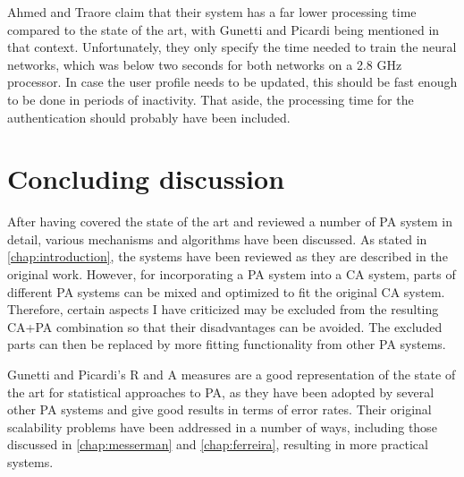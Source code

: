 \documentclass[informationsecurity]{gucmasterproject}
\begin{document}
Ahmed and Traore \cite{Ahmed} claim that their system has a far lower processing time compared to the state of the art, with Gunetti and Picardi \cite{gnp} being mentioned in that context.
Unfortunately, they only specify the time needed to train the neural networks, which was below two seconds for both networks on a 2.8 GHz processor.
In case the user profile needs to be updated, this should be fast enough to be done in periods of inactivity.
That aside, the processing time for the authentication should probably have been included.








\chapter{Concluding discussion}
\label{chap:conclusion}

After having covered the state of the art and reviewed a number of PA system in detail, various mechanisms and algorithms have been discussed.
As stated in \cref{chap:introduction}, the systems have been reviewed as they are described in the original work.
However, for incorporating a PA system into a CA system, parts of different PA systems can be mixed and optimized to fit the original CA system.
Therefore, certain aspects I have criticized may be excluded from the resulting CA+PA combination so that their disadvantages can be avoided.
The excluded parts can then be replaced by more fitting functionality from other PA systems.

Gunetti and Picardi's \cite{gnp} R and A measures are a good representation of the state of the art for statistical approaches to PA, as they have been adopted by several other PA systems and give good results in terms of error rates.
Their original scalability problems have been addressed in a number of ways, including those discussed in \cref{chap:messerman} and \cref{chap:ferreira}, resulting in more practical systems.
\end{document}
